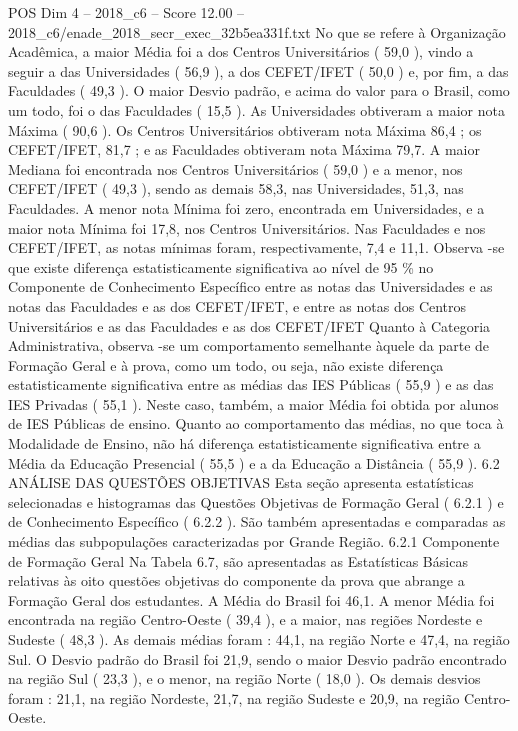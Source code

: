 \begin{textsample}{POS Dim 4 – 2018\_c6 – Score 12.00 – 2018\_c6/enade\_2018\_secr\_exec\_32b5ea331f.txt}
No que se refere à Organização Acadêmica, a maior Média foi a dos Centros Universitários ( 59,0 ), vindo a seguir a das Universidades ( 56,9 ), a dos CEFET/IFET ( 50,0 ) e, por fim, a das Faculdades ( 49,3 ).
O maior Desvio padrão, e acima do valor para o Brasil, como um todo, foi o das Faculdades ( 15,5 ).
As Universidades obtiveram a maior nota Máxima ( 90,6 ).
Os Centros Universitários obtiveram nota Máxima 86,4 ; os CEFET/IFET, 81,7 ; e as Faculdades obtiveram nota Máxima 79,7.
A maior Mediana foi encontrada nos Centros Universitários ( 59,0 ) e a menor, nos CEFET/IFET ( 49,3 ), sendo as demais 58,3, nas Universidades, 51,3, nas Faculdades.
A menor nota Mínima foi zero, encontrada em Universidades, e a maior nota Mínima foi 17,8, nos Centros Universitários.
Nas Faculdades e nos CEFET/IFET, as notas mínimas foram, respectivamente, 7,4 e 11,1.
Observa -se que existe diferença estatisticamente significativa ao nível de 95 \% no Componente de Conhecimento Específico entre as notas das Universidades e as notas das Faculdades e as dos CEFET/IFET, e entre as notas dos Centros Universitários e as das Faculdades e as dos CEFET/IFET Quanto à Categoria Administrativa, observa -se um comportamento semelhante àquele da parte de Formação Geral e à prova, como um todo, ou seja, não existe diferença estatisticamente significativa entre as médias das IES Públicas ( 55,9 ) e as das IES Privadas ( 55,1 ).
Neste caso, também, a maior Média foi obtida por alunos de IES Públicas de ensino.
Quanto ao comportamento das médias, no que toca à Modalidade de Ensino, não há diferença estatisticamente significativa entre a Média da Educação Presencial ( 55,5 ) e a da Educação a Distância ( 55,9 ). 6.2 ANÁLISE DAS QUESTÕES OBJETIVAS Esta seção apresenta estatísticas selecionadas e histogramas das Questões Objetivas de Formação Geral ( 6.2.1 ) e de Conhecimento Específico ( 6.2.2 ).
São também apresentadas e comparadas as médias das subpopulações caracterizadas por Grande Região. 6.2.1 Componente de Formação Geral Na Tabela 6.7, são apresentadas as Estatísticas Básicas relativas às oito questões objetivas do componente da prova que abrange a Formação Geral dos estudantes.
A Média do Brasil foi 46,1.
A menor Média foi encontrada na região Centro-Oeste ( 39,4 ), e a maior, nas regiões Nordeste e Sudeste ( 48,3 ).
As demais médias foram : 44,1, na região Norte e 47,4, na região Sul.
O Desvio padrão do Brasil foi 21,9, sendo o maior Desvio padrão encontrado na região Sul ( 23,3 ), e o menor, na região Norte ( 18,0 ).
Os demais desvios foram : 21,1, na região Nordeste, 21,7, na região Sudeste e 20,9, na região Centro-Oeste.

\end{textsample}
